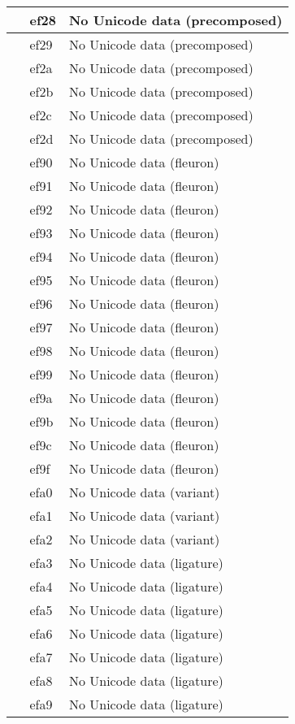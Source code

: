\documentclass[12pt,letterpaper,openany]{book}
\begin{document}
\begin{center}
\begin{supertabular}{|m{0.25in}|m{0.5in}|m{4in}|}
			 & ef28 & No Unicode data (precomposed)\\\hline
			 & ef29 & No Unicode data (precomposed)\\\hline
			 & ef2a & No Unicode data (precomposed)\\\hline
			 & ef2b & No Unicode data (precomposed)\\\hline
			 & ef2c & No Unicode data (precomposed)\\\hline
			 & ef2d & No Unicode data (precomposed)\\\hline
			 & ef90 & No Unicode data (fleuron)\\\hline
			 & ef91 & No Unicode data (fleuron)\\\hline
			 & ef92 & No Unicode data (fleuron)\\\hline
			 & ef93 & No Unicode data (fleuron)\\\hline
			 & ef94 & No Unicode data (fleuron)\\\hline
			 & ef95 & No Unicode data (fleuron)\\\hline
			 & ef96 & No Unicode data (fleuron)\\\hline
			 & ef97 & No Unicode data (fleuron)\\\hline
			 & ef98 & No Unicode data (fleuron)\\\hline
			 & ef99 & No Unicode data (fleuron)\\\hline
			 & ef9a & No Unicode data (fleuron)\\\hline
			 & ef9b & No Unicode data (fleuron)\\\hline
			 & ef9c & No Unicode data (fleuron)\\\hline
			 & ef9f & No Unicode data (fleuron)\\\hline
			 & efa0 & No Unicode data (variant)\\\hline
			 & efa1 & No Unicode data (variant)\\\hline
			 & efa2 & No Unicode data (variant)\\\hline
			 & efa3 & No Unicode data (ligature)\\\hline
			 & efa4 & No Unicode data (ligature)\\\hline
			 & efa5 & No Unicode data (ligature)\\\hline
			 & efa6 & No Unicode data (ligature)\\\hline
			 & efa7 & No Unicode data (ligature)\\\hline
			 & efa8 & No Unicode data (ligature)\\\hline
			 & efa9 & No Unicode data (ligature)\\\hline

\end{supertabular}
\end{center}
\end{document}
